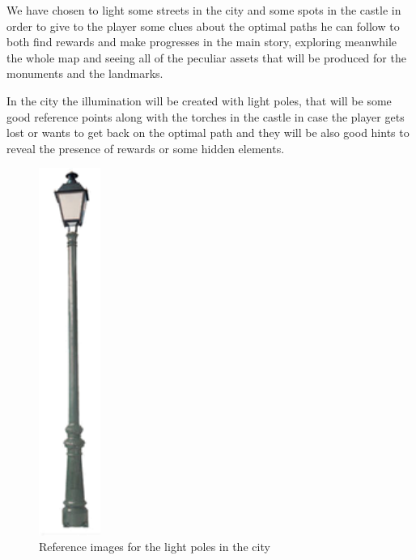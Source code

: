 We have chosen to light some streets in the city and some spots in the castle in order to give to the player some clues about the optimal paths he can follow to both find rewards and make progresses in the main story, exploring meanwhile the whole map and seeing all of the peculiar assets that will be produced for the monuments and the landmarks.

In the city the illumination will be created with light poles, that will be some good reference points along with the torches in the castle in case the player gets lost or wants to get back on the optimal path and they will be also good hints to reveal the presence of rewards or some hidden elements.

\begin{figure}[H]
  \centering
  \includegraphics[height=12cm]{Images/Landmarks/lightPole}
  \caption{Reference images for the light poles in the city}
\end{figure}

